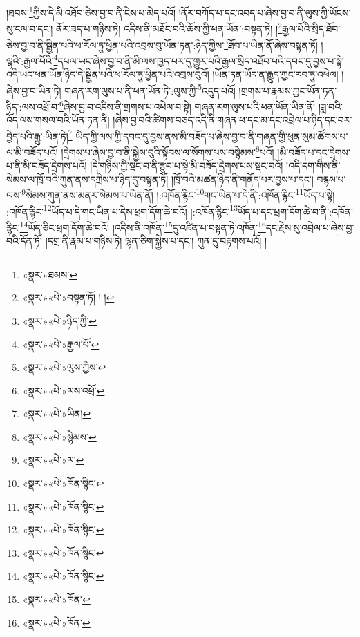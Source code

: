 །ཐབས་\footnote{«སྣར་»ཐམས་}ཀྱིས་དེ་མི་འཐོབ་ཅེས་བྱ་བ་ནི་ངེས་པ་མེད་པའོ། །ནོར་བཀོད་པ་དང་འབད་པ་ཞེས་བྱ་བ་ནི་ལུས་ཀྱི་ཡོངས་སུ་ངལ་བ་དང་། ནོར་ཟད་པ་གཉིས་ཏེ། འདིས་ནི་མཐོང་བའི་ཆོས་ཀྱི་ཕན་ཡོན་:བསྟན་ཏེ། །\footnote{«སྣར་»«པེ་»བསྟན་ཏོ། ། །}རྒྱལ་པོའི་སྲིད་ཐོབ་ཅེས་བྱ་བ་ནི་སྦྱིན་པའི་ཕ་རོལ་ཏུ་ཕྱིན་པའི་འབྲས་བུ་ཡོན་ཏན་:ཉིད་ཀྱིས་\footnote{«སྣར་»«པེ་»ཉིད་ཀྱི་}ཐོབ་པ་ཡིན་ནོ་ཞེས་བསྟན་ཏོ། །ལྷའི་:རྒྱལ་པོའི་\footnote{«སྣར་»«པེ་»རྒྱལ་པོ་}དཔལ་ཡང་ཞེས་བྱ་བ་ནི་མི་ལས་ཁྱད་པར་དུ་གྱུར་པའི་རྒྱལ་སྲིད་འཐོབ་པའི་དབང་དུ་བྱས་པ་སྟེ། འདི་ཡང་ཕན་ཡོན་ཉིད་དེ་སྦྱིན་པའི་ཕ་རོལ་ཏུ་ཕྱིན་པའི་འབྲས་བུའོ། །ཡོན་ཏན་ཡོད་ན་རྒྱུད་ཀྱང་རབ་ཏུ་འཕེལ། །ཞེས་བྱ་བ་ཡིན་ཏེ། གཞན་རག་ལུས་པ་ནི་ཕན་ཡོན་ཏེ་:ལུས་ཀྱི་\footnote{«སྣར་»«པེ་»ལུས་ཀྱིས་}འདུད་པའོ། །གྲགས་པ་རྣམས་ཀྱང་ཡོན་ཏན་ཉིད་:ལས་འཕྲོ་བ་\footnote{«སྣར་»«པེ་»ལས་འཕྲོ་}ཞེས་བྱ་བ་འདིས་ནི་གྲགས་པ་འཕེལ་བ་སྟེ། གཞན་རག་ལུས་པའི་ཕན་ཡོན་ཡིན་ནོ། །ཟླ་བའི་འོད་ལས་གསལ་བའི་ཡོན་ཏན་ནི། །ཞེས་བྱ་བའི་ཚིགས་བཅད་འདི་ནི་གཞན་ཕ་དང་མ་དང་འབྲེལ་པ་ཉིད་དང་བར་བྱེད་པའི་རྒྱུ་:ཡིན་ཏེ།\footnote{«སྣར་»«པེ་»ཡིན།} ཡིད་ཀྱི་ལས་ཀྱི་དབང་དུ་བྱས་ནས་མི་བཟོད་པ་ཞེས་བྱ་བ་ནི་གཞན་གྱི་ཕུན་སུམ་ཚོགས་པ་ལ་མི་བཟོད་པའོ། །དྲེགས་པ་ཞེས་བྱ་བ་ནི་སྐྱེས་བུའི་སྟོབས་ལ་སོགས་པས་བསྙེམས་\footnote{«སྣར་»«པེ་»སྙེམས་}པའོ། །མི་བཟོད་པ་དང་དྲེགས་པ་ནི་མི་བཟོད་དྲེགས་པའོ། །དེ་གཉིས་ཀྱི་སྡང་བ་ནི་རྩུབ་པ་སྟེ་མི་བཟོད་དྲེགས་པས་སྡང་བའོ། །འདི་དག་གིས་ནི་སེམས་ལ་ཁྲོ་བའི་ཀུན་ནས་དཀྲིས་པ་ཉིད་དུ་བསྟན་ཏོ། །ཁྲོ་བའི་མཚན་ཉིད་ནི་གནོད་པར་བྱས་པ་དང་། བརྙས་པ་ལས་\footnote{«སྣར་»«པེ་»ལ་}སེམས་ཀུན་ནས་མནར་སེམས་པ་ཡིན་ནོ། །:འཁོན་རྙིང་\footnote{«སྣར་»«པེ་»ཁོན་སྙིང་}གང་ཡིན་པ་དེ་ནི་:འཁོན་རྙིང་\footnote{«སྣར་»«པེ་»ཁོན་སྙིང་}ཡོད་པ་སྟེ། :འཁོན་རྙིང་\footnote{«སྣར་»«པེ་»ཁོན་སྙིང་}ཡོད་པ་དེ་གང་ཡིན་པ་དེས་ཕྲག་དོག་ཆེ་བའོ། །:འཁོན་རྙིང་\footnote{«སྣར་»«པེ་»ཁོན་སྙིང་}ཡོད་པ་དང་ཕྲག་དོག་ཆེ་བ་ནི་:འཁོན་རྙིང་\footnote{«སྣར་»«པེ་»ཁོན་སྙིང་}ཡོད་ཅིང་ཕྲག་དོག་ཆེ་བའོ། །འདིས་ནི་འཁོན་\footnote{«སྣར་»«པེ་»ཁོན་}དུ་འཛིན་པ་བསྟན་ཏེ་འཁོན་\footnote{«སྣར་»«པེ་»ཁོན་}དང་རྗེས་སུ་འབྲེལ་པ་ཞེས་བྱ་བའི་དོན་ཏོ། །དགྲ་ནི་རྣམ་པ་གཉིས་ཏེ། ལྷན་ཅིག་སྐྱེས་པ་དང་། ཀུན་དུ་བརྟགས་པའོ། །
